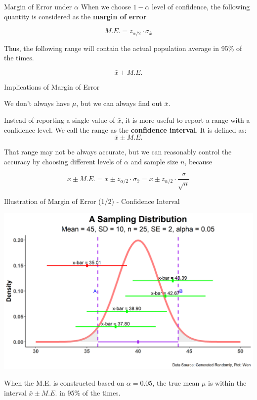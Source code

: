 \documentclass{beamer}
\begin{document}
\begin{frame}{Margin of Error under $\alpha$}
When we choose $1 - \alpha$ level of confidence, the following quantity is considered as the \textbf{margin of error} 

$$M.E. = z_{\alpha/2} \cdot \sigma_{\bar{x}}$$

Thus, the following range will contain the actual population average in 95\% of the times.

$$\bar{x} \pm M.E. $$

\end{frame}


\begin{frame}{Implications of Margin of Error}


We don't always have $\mu$, but we can always find out $\bar{x}$.

\vspace{0.3 cm}
Instead of reporting a single value of $\bar{x}$, it is more useful to report a range with  a confidence level. We call the range as the \textbf{confidence interval}. It is defined as: 
$$ \bar{x} \pm M.E. $$

\vspace{0.3 cm}
That range may not be always accurate, but we can reasonably control the accuracy by choosing different levels of $\alpha$ and sample size $n$, because

$$\bar{x} \pm M.E. = \bar{x} \pm z_{\alpha/2} \cdot \sigma_{\bar{x}} = \bar{x} \pm z_{\alpha/2}\cdot \frac{\sigma}{\sqrt{n}}$$


\end{frame}


\begin{frame}{Illustration of Margin of Error (1/2) - Confidence Interval}

\includegraphics[scale=0.5]{images/SamplingDistIntervals.png}

When the M.E. is constructed based on $\alpha = 0.05$, the true mean $\mu$ is within the interval $\bar{x} \pm M.E.$ in 95\% of the times. 

\end{frame}
\end{document}
